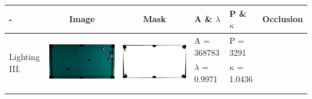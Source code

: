 \begin{table}[H]
\begin{tabular}{|l|c|c|l|l|c|}
\hline - & Image & Mask & A \& $\lambda$ & P \& $\kappa$ & Occlusion \\ 
\hline


\multirow{4}{*}{Lighting III.} & \multirow{4}{*}{\includegraphics[scale=0.08]{../images/1/14_img.png}} & \multirow{4}{*}{\includegraphics[scale=0.08]{../images/1/14_mask.png}} & A = 368783 & P = 3291 & \multirow{4}{*}{}\\ 
& & & $\lambda$ = 0.9971 & $\kappa$ = 1.0436 & \\
&&&&&\\
&&&&&\\
\hline


\end{tabular}
\end{table}
